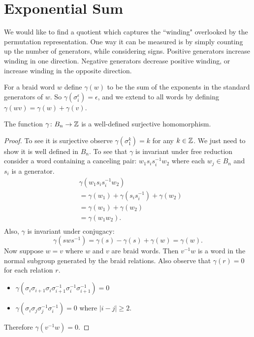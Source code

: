 \documentclass[12pt]{thesis}
\begin{document}
\section{Exponential Sum}

We would like to find a quotient which captures
the ``winding" overlooked by the permutation representation.
One way it can be measured is by simply counting up the number of generators,
while considering signs.
Positive generators increase winding in one direction.
Negative generators decrease positive winding, or increase winding in the opposite direction.

For a braid word $w$ define $\gamma(w)$ 
to be the sum of the exponents in the standard generators of $w$.
So $\gamma(\sigma_{i}^{\epsilon}) = \epsilon$,
and we extend to all words by defining $\gamma(wv) = \gamma(w) + \gamma(v)$.

\begin{proposition}
    The function $\gamma \colon B_{n} \rightarrow \mathbb{Z}$ is a well-defined surjective homomorphism.
\end{proposition}

\begin{proof}
    To see it is surjective observe $\gamma(\sigma_{1}^{k}) = k$ for any $k \in \mathbb{Z}$.
    We just need to show it is well defined in $B_{n}$.
    To see that $\gamma$ is invariant under free reduction
    consider a word containing a canceling pair: $w_{1}s_{i}s_{i}^{-1}w_{2}$
    where each $w_{j} \in B_{n}$ and $s_{i}$ is a generator.
    \[
    \begin{split}
        &\gamma(w_{1}s_{i}s_{i}^{-1}w_{2}) \\
        &= \gamma(w_{1}) + \gamma(s_{i}s_{i}^{-1}) + \gamma(w_{2}) \\
        &= \gamma(w_{1}) + \gamma(w_{2}) \\
        &= \gamma(w_{1}w_{2}). \\
    \end{split}
    \]
    Also, $\gamma$ is invariant under conjugacy:
    \[
        \gamma(sws^{-1}) = \gamma(s) - \gamma(s) + \gamma(w) = \gamma(w).
    \]
    Now suppose $w = v$ where $w$ and $v$ are braid words. 
    Then $v^{-1}w$ is a word in the normal subgroup generated by the braid relations.
    Also observe that  $\gamma(r) = 0$ for each relation $r$.
    \begin{itemize}
        \item $\gamma(\sigma_{i}\sigma_{i+1}\sigma_{i}\sigma_{i+1}^{-1}\sigma_{i}^{-1}\sigma_{i+1}^{-1}) = 0$
        \item $\gamma(\sigma_{i}\sigma_{j}\sigma_{j}^{-1}\sigma_{i}^{-1}) = 0$ where $|i - j| \geq 2$.
    \end{itemize}
    Therefore $\gamma(v^{-1}w) = 0$.
\end{proof}
\end{document}
